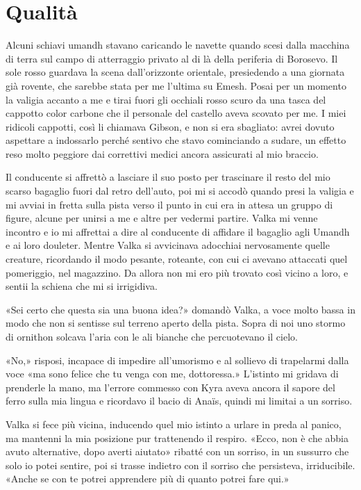 \chapter{Qualità}

Alcuni schiavi umandh stavano caricando le navette quando scesi dalla
macchina di terra sul campo di atterraggio privato al di là della
periferia di Borosevo. Il sole rosso guardava la scena dall'orizzonte
orientale, presiedendo a una giornata già rovente, che sarebbe stata per
me l'ultima su Emesh. Posai per un momento la valigia accanto a me e
tirai fuori gli occhiali rosso scuro da una tasca del cappotto color
carbone che il personale del castello aveva scovato per me. I miei
ridicoli cappotti, così li chiamava Gibson, e non si era sbagliato:
avrei dovuto aspettare a indossarlo perché sentivo che stavo cominciando
a sudare, un effetto reso molto peggiore dai correttivi medici ancora
assicurati al mio braccio.

Il conducente si affrettò a lasciare il suo posto per trascinare il
resto del mio scarso bagaglio fuori dal retro dell'auto, poi mi si
accodò quando presi la valigia e mi avviai in fretta sulla pista verso
il punto in cui era in attesa un gruppo di figure, alcune per unirsi a
me e altre per vedermi partire. Valka mi venne incontro e io mi
affrettai a dire al conducente di affidare il bagaglio agli Umandh e ai
loro douleter. Mentre Valka si avvicinava adocchiai nervosamente quelle
creature, ricordando il modo pesante, roteante, con cui ci avevano
attaccati quel pomeriggio, nel magazzino. Da allora non mi ero più
trovato così vicino a loro, e sentii la schiena che mi si irrigidiva.

«Sei certo che questa sia una buona idea?» domandò Valka, a voce molto
bassa in modo che non si sentisse sul terreno aperto della pista. Sopra
di noi uno stormo di ornithon solcava l'aria con le ali bianche che
percuotevano il cielo.

«No,» risposi, incapace di impedire all'umorismo e al sollievo di
trapelarmi dalla voce «ma sono felice che tu venga con me, dottoressa.»
L'istinto mi gridava di prenderle la mano, ma l'errore commesso con Kyra
aveva ancora il sapore del ferro sulla mia lingua e ricordavo il bacio
di Anaïs, quindi mi limitai a un sorriso.

Valka si fece più vicina, inducendo quel mio istinto a urlare in preda
al panico, ma mantenni la mia posizione pur trattenendo il respiro.
«Ecco, non è che abbia avuto alternative, dopo averti aiutato» ribatté
con un sorriso, in un sussurro che solo io potei sentire, poi si trasse
indietro con il sorriso che persisteva, irriducibile. «Anche se con te
potrei apprendere più di quanto potrei fare qui.»

